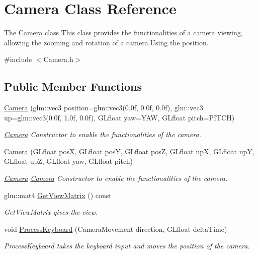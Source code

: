\hypertarget{class_camera}{}\section{Camera Class Reference}
\label{class_camera}


The \hyperlink{class_camera}{Camera} class This class provides the functionalities of a camera viewing, allowing the zooming and rotation of a camera.\+Using the position.  




{\ttfamily \#include $<$Camera.\+h$>$}

\subsection*{Public Member Functions}
\begin{DoxyCompactItemize}
\item 
\hyperlink{class_camera_a535f3a2413a88c2f1e7d1147bec0039c}{Camera} (glm\+::vec3 position=glm\+::vec3(0.\+0f, 0.\+0f, 0.\+0f), glm\+::vec3 up=glm\+::vec3(0.\+0f, 1.\+0f, 0.\+0f), G\+Lfloat yaw=\+Y\+A\+W, G\+Lfloat pitch=\+P\+I\+T\+C\+H)
\begin{DoxyCompactList}\small\item\em \hyperlink{class_camera}{Camera} Constructor to enable the functionalities of the camera. \end{DoxyCompactList}\item 
\hyperlink{class_camera_a1efd973829c22d5fe15a26ede3357ee5}{Camera} (G\+Lfloat pos\+X, G\+Lfloat pos\+Y, G\+Lfloat pos\+Z, G\+Lfloat up\+X, G\+Lfloat up\+Y, G\+Lfloat up\+Z, G\+Lfloat yaw, G\+Lfloat pitch)
\begin{DoxyCompactList}\small\item\em \hyperlink{class_camera}{Camera} \hyperlink{class_camera}{Camera} Constructor to enable the functionalities of the camera. \end{DoxyCompactList}\item 
glm\+::mat4 \hyperlink{class_camera_a739bf4fedace8b3d12868d19726df832}{Get\+View\+Matrix} () const 
\begin{DoxyCompactList}\small\item\em Get\+View\+Matrix gives the view. \end{DoxyCompactList}\item 
void \hyperlink{class_camera_ac922d266d0a88dbdde47a7be7736766d}{Process\+Keyboard} (Camera\+Movement direction, G\+Lfloat delta\+Time)
\begin{DoxyCompactList}\small\item\em Process\+Keyboard takes the keyboard input and moves the position of the camera. \end{DoxyCompactList}\item 

\end{DoxyCompactItemize}
